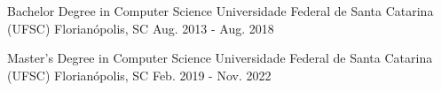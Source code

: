 

\begin{cventries}

  \cventry
    {Bachelor Degree in Computer Science} %
    {Universidade Federal de Santa Catarina (UFSC)} %
    {Florianópolis, SC} %
    {Aug. 2013 - Aug. 2018} %
    {}

   \cventry
     {Master's Degree in Computer Science} %
     {Universidade Federal de Santa Catarina (UFSC)} %
     {Florianópolis, SC} %
     {Feb. 2019 - Nov. 2022} %
     {}

\end{cventries}
